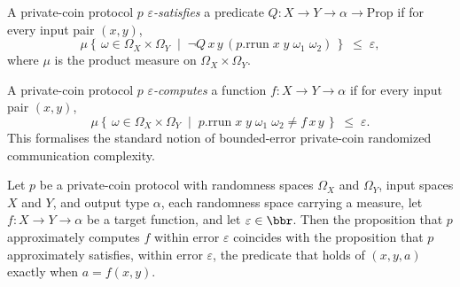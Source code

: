 \begin{definition}
\label{CommunicationComplexity.PrivateCoin.Protocol.ApproxSatisfies}
\leanok
{}
A private-coin protocol $p$ \emph{$\varepsilon$-satisfies} a predicate
$Q : X \to Y \to \alpha \to \mathrm{Prop}$ if for every input pair $(x, y)$,
\[
  \mu\!\left\{\,\omega \in \Omega_X \times \Omega_Y \;\middle|\;
    \neg Q\,x\,y\,(p.\mathrm{rrun}\;x\;y\;\omega_1\;\omega_2)\,\right\} \;\le\; \varepsilon,
\]
where $\mu$ is the product measure on $\Omega_X \times \Omega_Y$.
\end{definition}

\begin{definition}
\label{CommunicationComplexity.PrivateCoin.Protocol.ApproxComputes}
\leanok
{}
A private-coin protocol $p$ \emph{$\varepsilon$-computes} a function $f : X \to Y \to \alpha$ if
for every input pair $(x, y)$,
\[
  \mu\!\left\{\,\omega \in \Omega_X \times \Omega_Y \;\middle|\;
    p.\mathrm{rrun}\;x\;y\;\omega_1\;\omega_2 \ne f\,x\,y\,\right\} \;\le\; \varepsilon.
\]
This formalises the standard notion of bounded-error private-coin randomized
communication complexity.
\end{definition}

\begin{theorem}
\label{CommunicationComplexity.PrivateCoin.Protocol.ApproxComputes_eq_ApproxSatisfies}
\leanok
{}
Let $p$ be a private-coin protocol with randomness spaces $\Omega_X$ and $\Omega_Y$,
input spaces $X$ and $Y$, and output type $\alpha$, each randomness space carrying a
measure, let $f : X \to Y \to \alpha$ be a target function, and let $\varepsilon \in
\bbr$. Then the proposition that $p$ approximately computes $f$ within error
$\varepsilon$ coincides with the proposition that $p$ approximately satisfies, within
error $\varepsilon$, the predicate that holds of $(x, y, a)$ exactly when $a = f(x, y)$.
\end{theorem}
